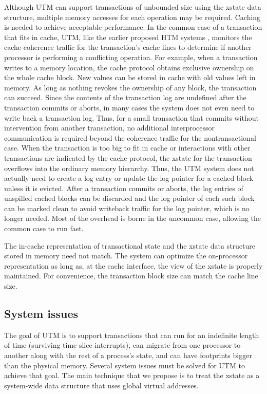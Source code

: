Although UTM can support transactions of unbounded size using the
xstate data structure, multiple memory accesses for each operation may
be required.  Caching is needed to achieve acceptable performance.  In
the common case of a transaction that fits in cache, UTM, like the
earlier proposed HTM systems \cite{Knight86,HerlihyMo93}, monitors the
cache-coherence traffic for the transaction's cache lines to determine
if another processor is performing a conflicting operation.  For
example, when a transaction writes to a memory location, the cache
protocol obtains exclusive ownership on the whole cache block.  New
values can be stored in cache with old values left in memory.  As long
as nothing revokes the ownership of any block, the transaction can
succeed.  Since the contents of the transaction log are undefined
after the transaction commits or aborts, in many cases the system does
not even need to write back a transaction log.  Thus, for a small
transaction that commits without intervention from another
transaction, no additional interprocessor communication is required
beyond the coherence traffic for the nontransactional case.  When the
transaction is too big to fit in cache or interactions with other
transactions are indicated by the cache protocol, the xstate for the
transaction overflows into the ordinary memory hierarchy.  Thus, the
UTM system does not actually need to create a log entry or update
the log pointer for a cached block unless it is evicted.  After a
transaction commits or aborts, the log entries of unspilled cached
blocks can be discarded and the log pointer of each such block can be
marked clean to avoid writeback traffic for the log pointer, which is
no longer needed.  Most of the overhead is borne in the uncommon case,
allowing the common case to run fast.

The in-cache representation of transactional state and the xstate data
structure stored in memory need not match.  The system can optimize
the on-processor representation as long as, at the cache interface, the
view of the xstate is properly maintained.  For convenience, the
transaction block size can match the cache line size.

\subsection{System issues}

The goal of UTM is to support transactions that can run for an
indefinite length of time (surviving time slice interrupts), can
migrate from one processor to another along with the rest of a
process's state, and can have footprints bigger than the physical
memory.  Several system issues must be solved for UTM to achieve that
goal.  The main technique that we propose is to treat the xstate as
a system-wide data structure that uses global virtual addresses.

